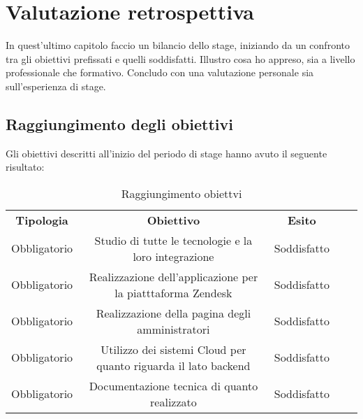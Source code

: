 
\chapter{Valutazione retrospettiva
}
\label{cap:conclusioni}
In quest'ultimo capitolo faccio un bilancio dello stage, iniziando da un confronto tra
gli obiettivi prefissati e quelli soddisfatti.
Illustro cosa ho appreso, sia a livello professionale che formativo.
Concludo con una valutazione personale sia sull’esperienza di stage.
\section{Raggiungimento degli obiettivi}
Gli obiettivi descritti all'inizio del periodo di stage hanno avuto il seguente risultato:
\begin{center}
	\begin{table}[h]
		\centering
		\begin{tabular}{|c|c|c|ll}
			\cline{1-3}
			\textbf{Tipologia}          & \textbf{Obiettivo} & \textbf{Esito} &  &  \\ \cline{1-3}
			Obbligatorio       & Studio di tutte le tecnologie e la loro integrazione                   & Soddisfatto                   &  &  \\
			\cline{1-3}
			Obbligatorio&  Realizzazione dell'applicazione per la piatttaforma Zendesk                   & Soddisfatto                    &  &  \\
			\cline{1-3}
		Obbligatorio & Realizzazione della pagina degli amministratori                    & Soddisfatto                     &  &  \\ \cline{1-3}
			Obbligatorio   & Utilizzo dei sistemi Cloud per quanto riguarda il lato backend                   & Soddisfatto                    &  &  \\ \cline{1-3}
			Obbligatorio   & Documentazione tecnica di quanto realizzato                   & Soddisfatto                    &  &  \\ \cline{1-3}
		\end{tabular}
	\caption{Raggiungimento obiettvi}
	\end{table}
	\label{tab:Soddisfacimento Requisiti}

\end{center}
